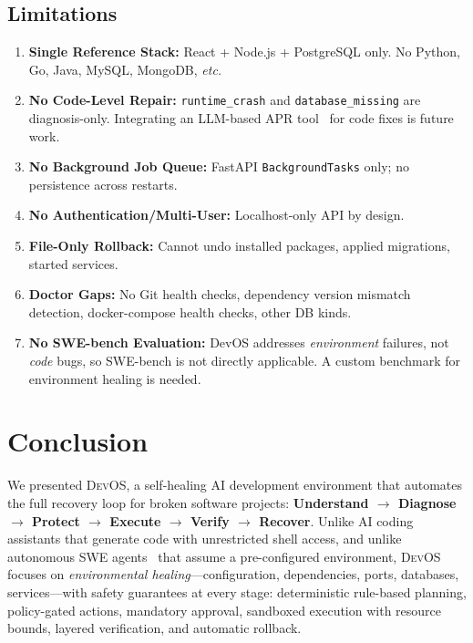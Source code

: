 \documentclass[conference,10pt,caption=false]{IEEEtran}
\newcommand{\devos}{\textsc{DevOS}\xspace}
\newcommand{\etc}{\textit{etc.}\xspace}
\begin{document}
\subsection{Limitations}
\label{sec:limitations}
\begin{enumerate}[leftmargin=*, nosep]
    \item \textbf{Single Reference Stack:} React + Node.js + PostgreSQL only. No Python, Go, Java, MySQL, MongoDB, \etc
    \item \textbf{No Code-Level Repair:} \texttt{runtime\_crash} and \texttt{database\_missing} are diagnosis-only. Integrating an LLM-based APR tool~\cite{llm-apr-survey-2025} for code fixes is future work.
    \item \textbf{No Background Job Queue:} FastAPI \texttt{BackgroundTasks} only; no persistence across restarts.
    \item \textbf{No Authentication/Multi-User:} Localhost-only API by design.
    \item \textbf{File-Only Rollback:} Cannot undo installed packages, applied migrations, started services.
    \item \textbf{Doctor Gaps:} No Git health checks, dependency version mismatch detection, docker-compose health checks, other DB kinds.
    \item \textbf{No SWE-bench Evaluation:} DevOS addresses \textit{environment} failures, not \textit{code} bugs, so SWE-bench is not directly applicable. A custom benchmark for environment healing is needed.
\end{enumerate}

\section{Conclusion}
\label{sec:conclusion}

We presented \devos, a self-healing AI development environment that automates the full recovery loop for broken software projects: \textbf{Understand $\to$ Diagnose $\to$ Protect $\to$ Execute $\to$ Verify $\to$ Recover}. Unlike AI coding assistants that generate code with unrestricted shell access, and unlike autonomous SWE agents~\cite{swe-agent, devin} that assume a pre-configured environment, \devos focuses on \textit{environmental healing}---configuration, dependencies, ports, databases, services---with safety guarantees at every stage: deterministic rule-based planning, policy-gated actions, mandatory approval, sandboxed execution with resource bounds, layered verification, and automatic rollback.
\end{document}
